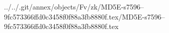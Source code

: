 ../../.git/annex/objects/Fv/zk/MD5E-s7596--9fc573366ffd0c3458f0f88a3fb8880f.tex/MD5E-s7596--9fc573366ffd0c3458f0f88a3fb8880f.tex
